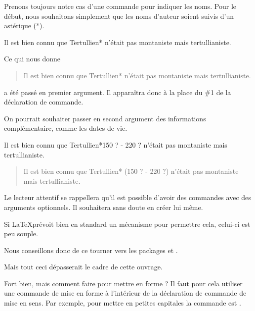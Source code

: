 Prenons toujours notre cas d'une commande pour indiquer les noms. Pour le début, nous souhaitons simplement que les noms d'auteur soient suivis d'un astérique (*).

\begin{latexcode}
\newcommand{\auteur}[1]{#1*}
Il est bien connu que \auteur{Tertullien} n'était pas montaniste
mais tertullianiste.
\end{latexcode}

\newcommand{\auteur}[1]{#1*}

Ce qui nous donne
\begin{quotation}
Il est bien connu que \auteur{Tertullien} n'était pas montaniste mais tertullianiste.
\end{quotation}


 a été passé en premier argument. Il apparaîtra donc à la place du \#1 de la déclaration de commande.

On pourrait souhaiter passer en second argument des informations complémentaire, comme les dates de vie.

\begin{latexcode}
\newcommand{\auteur}[2]{#1* (#2)}
Il est bien connu que \auteur{Tertullien}{150 ? - 220 ?}
n'était pas montaniste mais tertullianiste.
\end{latexcode}

\renewcommand{\auteur}[2]{#1* (#2)}

\begin{quotation}
Il est bien connu que \auteur{Tertullien}{150 ? - 220 ?}
n'était pas montaniste mais tertullianiste.
\end{quotation}

\begin{plusloins}
Le lecteur attentif se rappellera  qu'il est possible d'avoir des commandes avec des arguments optionnels. Il souhaitera sans doute en créer lui même.

Si \LaTeX prévoit bien en standard un mécanisme pour permettre cela, celui-ci est  peu souple. 

Nous conseillons donc de ce tourner vers les packages  et .

Mais tout ceci dépasserait le cadre de cette ouvrage.
\end{plusloins}

Fort bien, mais comment faire pour mettre en forme ? Il faut pour cela utiliser une commande de mise en forme à l'intérieur de la déclaration de commande de mise en sens. Par exemple, pour mettre en petites capitales la commande est .

